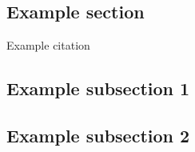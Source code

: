 \documentclass[11pt]{article}
\begin{document}
\begin{flushleft}
		\section{Example section}
		
		Example citation \cite{neuman2009challenges}
		
		\subsection{Example subsection 1}
		
		\subsection{Example subsection 2}
		
		\newpage
		
		
		
		
		
		
	\end{flushleft}
	
\end{document}
